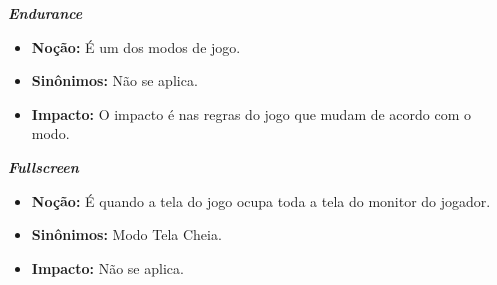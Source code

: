 \hypertarget{endurance}{\textbf{\textit{Endurance}}}
\begin{itemize}
\item\textbf{Noção:} É um dos modos de jogo.
\item\textbf{Sinônimos:} Não se aplica.
\item\textbf{Impacto:} O impacto é nas regras do jogo que mudam de acordo com o modo.
\end{itemize}

\hypertarget{fullscreen}{\textbf{\textit{Fullscreen}}}
\begin{itemize}
\item\textbf{Noção:} É quando a tela do jogo ocupa toda a tela do monitor do jogador.
\item\textbf{Sinônimos:} Modo Tela Cheia.
\item\textbf{Impacto:} Não se aplica.
\end{itemize}
